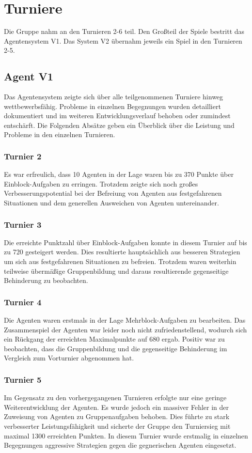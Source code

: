 \documentclass[runningheads]{llncs}
\begin{document}
\section{Turniere}\label{Turniere}
Die Gruppe nahm an den Turnieren 2-6 teil. Den Großteil der Spiele bestritt das Agentensystem V1. Das System V2 übernahm jeweils ein Spiel in den Turnieren 2-5. 

\subsection{Agent V1}
Das Agentensystem zeigte sich über alle teilgenommenen Turniere hinweg wettbewerbsfähig. Probleme in einzelnen Begegnungen wurden detailliert dokumentiert und im weiteren Entwicklungsverlauf behoben oder zumindest entschärft. Die Folgenden Absätze geben ein Überblick über die Leistung und Probleme in den einzelnen Turnieren.

\subsubsection{Turnier 2}
Es war erfreulich, dass 10 Agenten in der Lage waren bis zu 370 Punkte über Einblock-Aufgaben zu erringen. Trotzdem zeigte sich noch großes Verbesserungspotential bei der Befreiung von Agenten aus festgefahrenen Situationen und dem generellen Ausweichen von Agenten untereinander.

\subsubsection{Turnier 3}
Die erreichte Punktzahl über Einblock-Aufgaben konnte in diesem Turnier auf bis zu 720 gesteigert werden. Dies resultierte hauptsächlich aus besseren Strategien um sich aus festgefahrenen Situationen zu befreien. Trotzdem waren weiterhin teilweise übermäßige Gruppenbildung und daraus resultierende gegenseitige Behinderung zu beobachten.

\subsubsection{Turnier 4}
Die Agenten waren erstmals in der Lage Mehrblock-Aufgaben zu bearbeiten. Das Zusammenspiel der Agenten war leider noch nicht zufriedenstellend, wodurch sich ein Rückgang der erreichten Maximalpunkte auf 680 ergab. Positiv war zu beobachten, dass die Gruppenbildung und die gegenseitige Behinderung im Vergleich zum Vorturnier abgenommen hat.

\subsubsection{Turnier 5}
Im Gegensatz zu den vorhergegangenen Turnieren erfolgte nur eine geringe Weiterentwicklung der Agenten. Es wurde jedoch ein massiver Fehler in der Zuweisung von Agenten zu Gruppenaufgaben behoben. Dies führte zu stark verbesserter Leistungsfähigkeit und sicherte der Gruppe den Turniersieg mit maximal 1300 erreichten Punkten. In diesem Turnier wurde erstmalig in einzelnen Begegnungen aggressive Strategien gegen die gegnerischen Agenten eingesetzt.
\end{document}

